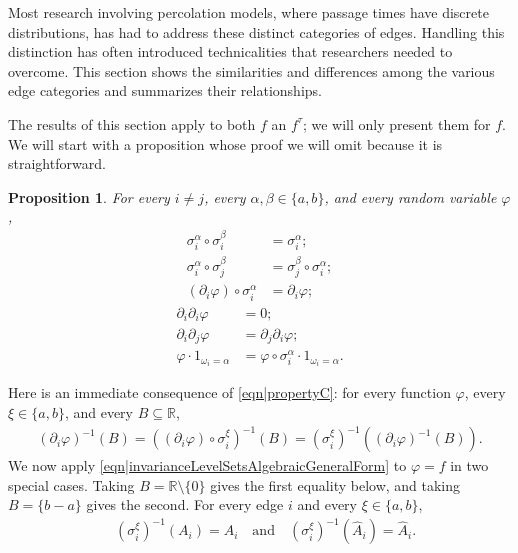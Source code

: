 \documentclass[reqno]{amsart}
\newtheorem{proposition}{Proposition}
\begin{document}
Most research involving percolation models, where passage times have discrete distributions, has had to address these distinct categories of edges. 
Handling this distinction has often introduced technicalities that researchers needed to overcome. This section shows the similarities and differences among the various edge categories and summarizes their relationships. 
 
The results of this section apply to both $f$ an $f^{\tau}$; we will only present them for $f$. 
We will start with a proposition whose proof we will omit because it is straightforward.
\begin{proposition}\label{thm|Straightforward} For every $i\neq j$, every $\alpha,\beta\in\{a,b\}$, and every random variable $\varphi$, 
\begin{align} 
\sigma_i^{\alpha}\circ \sigma_i^{\beta}&=\sigma_i^{\alpha};   \label{eqn|propertyA}\\
\sigma_i^{\alpha}\circ \sigma_j^{\beta}&=\sigma_j^{\beta}\circ\sigma_i^{\alpha};  \label{eqn|propertyB} \\
(\partial_i \varphi)\circ \sigma_i^{\alpha} &= \partial_i \varphi;  \label{eqn|propertyC}
\end{align} 
\begin{align}
\partial_i\partial_i \varphi&=0;  \label{eqn|propertyD} \\
\partial_i\partial_j \varphi&=\partial_j\partial_i\varphi;  \label{eqn|propertyE} \\
\varphi\cdot 1_{\omega_i=\alpha}&=\varphi\circ \sigma_i^{\alpha}\cdot 1_{\omega_i=\alpha}.  \label{eqn|propertyF}
\end{align}
\end{proposition}

 Here is an immediate consequence of 
\eqref{eqn|propertyC}: for every function $\varphi$, every 
$\xi\in\{a,b\}$, and every $B\subseteq \mathbb R$,
\begin{align} 
\left(\partial_i\varphi\right)^{-1}(B)
=\left((\partial_i\varphi) \circ \sigma_i^{\xi}\right)^{-1}(B)
=\left(\sigma_i^{\xi}\right)^{-1}\!\left((\partial_i\varphi)^{-1}(B)\right).
\label{eqn|invarianceLevelSetsAlgebraicGeneralForm}
\end{align}
We now apply \eqref{eqn|invarianceLevelSetsAlgebraicGeneralForm} to $\varphi=f$ in two special cases. 
Taking $B=\mathbb R\setminus\{0\}$ gives the first equality below, and taking $B=\{b-a\}$ gives the second. 
For every edge $i$ and every $\xi\in\{a,b\}$, 
\begin{align*}&
\left(\sigma_i^{\xi}\right)^{-1}(A_i)=A_i 
\quad\text{and}\quad 
\left(\sigma_i^{\xi}\right)^{-1}(\hat A_i)=\hat A_i. 
\end{align*}
 
\end{document}
